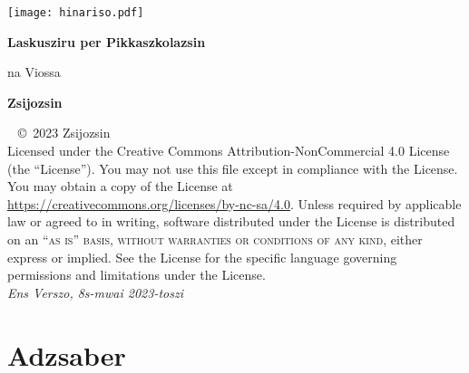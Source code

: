 \documentclass[12pt, a4paper]{legportokali}
\begin{document}

\onehalfspacing

\titlepage
{\texttt{[image: hinariso.pdf]}}
{
	\centering\sffamily
	{\Huge\bfseries Laskusziru per Pikkaszkolazsin \par}
	\vspace{16pt}
	{\LARGE na Viossa\par}
	\vspace{24pt}
	{\huge\bfseries Zsijozsin\par}
}

\thispagestyle{empty}
~\vfill
{
	\noindent \copyright\ 2023 Zsijozsin \\
	Licensed under the Creative Commons Attribution-NonCommercial 4.0 License (the ``License'').
	You may not use this file except in compliance with the License. You may obtain a copy of the
	License at \url{https://creativecommons.org/licenses/by-nc-sa/4.0}. Unless required by applicable
	law or agreed to in writing, software distributed under the License is distributed on an
	\textsc{``as is'' basis, without warranties or conditions of any kind}, either express or implied.
	See the License for the specific language governing permissions and limitations under the License. \\
	\textit{Ens Verszo, 8s-mwai 2023-toszi}
}

\pagestyle{empty}
\tableofcontents
\listoffigures
\listoftables

\pagestyle{fancy}
\cleardoublepage



\part{Adzsaber}

\end{document}
